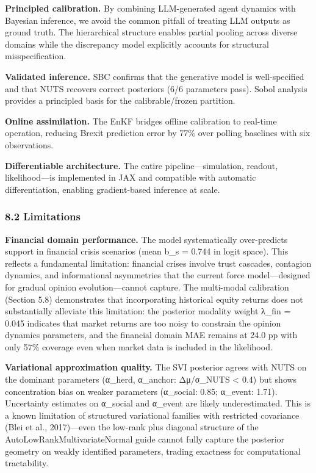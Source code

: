 \documentclass[
]{article}
\begin{document}
\textbf{Principled calibration.} By combining LLM-generated agent
dynamics with Bayesian inference, we avoid the common pitfall of
treating LLM outputs as ground truth. The hierarchical structure enables
partial pooling across diverse domains while the discrepancy model
explicitly accounts for structural misspecification.

\textbf{Validated inference.} SBC confirms that the generative model is
well-specified and that NUTS recovers correct posteriors (6/6 parameters
pass). Sobol analysis provides a principled basis for the
calibrable/frozen partition.

\textbf{Online assimilation.} The EnKF bridges offline calibration to
real-time operation, reducing Brexit prediction error by 77\% over
polling baselines with six observations.

\textbf{Differentiable architecture.} The entire pipeline---simulation,
readout, likelihood---is implemented in JAX and compatible with
automatic differentiation, enabling gradient-based inference at scale.

\subsubsection{8.2 Limitations}\label{limitations}

\textbf{Financial domain performance.} The model systematically
over-predicts support in financial crisis scenarios (mean
\textbar b\_s\textbar{} = 0.744 in logit space). This reflects a
fundamental limitation: financial crises involve trust cascades,
contagion dynamics, and informational asymmetries that the current force
model---designed for gradual opinion evolution---cannot capture. The
multi-modal calibration (Section 5.8) demonstrates that incorporating
historical equity returns does not substantially alleviate this
limitation: the posterior modality weight λ\_fin = 0.045 indicates that
market returns are too noisy to constrain the opinion dynamics
parameters, and the financial domain MAE remains at 24.0 pp with only
57\% coverage even when market data is included in the likelihood.

\textbf{Variational approximation quality.} The SVI posterior agrees
with NUTS on the dominant parameters (α\_herd, α\_anchor:
\textbar Δμ\textbar/σ\_NUTS \textless{} 0.4) but shows concentration
bias on weaker parameters (α\_social: 0.85; α\_event: 1.71). Uncertainty
estimates on α\_social and α\_event are likely underestimated. This is a
known limitation of structured variational families with restricted
covariance (Blei et al., 2017)---even the low-rank plus diagonal
structure of the AutoLowRankMultivariateNormal guide cannot fully
capture the posterior geometry on weakly identified parameters, trading
exactness for computational tractability.
\end{document}
